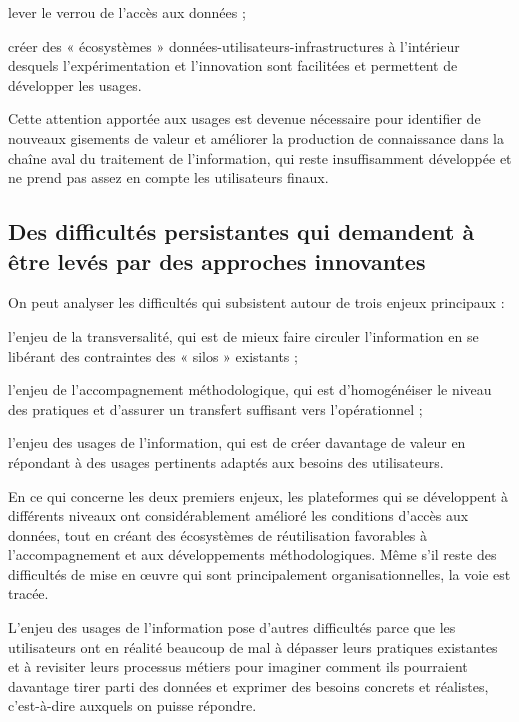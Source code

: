 \startitemize

\item lever le verrou de l'accès aux données ;

\item créer des « écosystèmes » données-utilisateurs-infrastructures à l'intérieur
desquels l'expérimentation et l'innovation sont facilitées et permettent de
développer les usages.

\stopitemize

Cette attention apportée aux usages est devenue nécessaire pour identifier de
nouveaux gisements de valeur et améliorer la production de connaissance
dans la chaîne aval du traitement de l'information, qui reste
insuffisamment développée et ne prend pas assez en compte les utilisateurs
finaux.


\subsection[constats:difficultes]
{Des difficultés persistantes qui demandent à être levés par des approches
innovantes}

On peut analyser les difficultés qui subsistent
autour de trois enjeux principaux :

\startitemize

\item l'enjeu de la transversalité, qui est de mieux faire circuler l'information en
se libérant des contraintes des « silos » existants ;

\item l'enjeu de l'accompagnement méthodologique, qui est d'homogénéiser le niveau
des pratiques et d'assurer un transfert suffisant vers l'opérationnel ;

\item l'enjeu des usages de l'information, qui est de créer davantage de valeur en
répondant à des usages pertinents adaptés aux besoins des utilisateurs.

\stopitemize

En ce qui concerne les deux premiers enjeux, les plateformes qui se
développent à différents niveaux ont considérablement amélioré les conditions
d'accès aux données, tout en créant des écosystèmes de réutilisation
favorables à l'accompagnement et aux développements méthodologiques.
Même s'il reste des difficultés de mise en œuvre qui sont principalement
organisationnelles, la voie est tracée.

L'enjeu des usages de l'information pose d'autres difficultés parce que les
utilisateurs ont en réalité beaucoup de mal à dépasser leurs pratiques
existantes et à revisiter leurs processus métiers pour imaginer comment ils
pourraient davantage tirer parti des données
et exprimer des besoins concrets et réalistes,
c'est-à-dire auxquels on puisse répondre.

